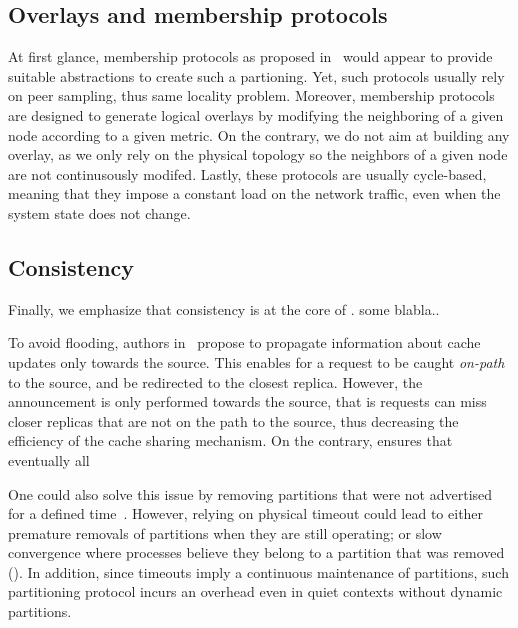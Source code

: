\subsection*{Overlays and membership protocols}
At first glance, membership protocols as proposed in~\cite{t-man} would appear to provide suitable abstractions to create such a partioning. Yet, such protocols usually rely on peer sampling, thus same locality problem.
Moreover, membership protocols are designed to generate logical overlays by modifying the neighboring of a given node according to a given metric. 
On the contrary, we do not aim at building any overlay, as we only rely on the physical topology so the neighbors of a given node are not continusously modifed. 
Lastly, these protocols are usually cycle-based, meaning that they impose a constant load on the network traffic, even when the system state does not change.

\subsection*{Consistency}
Finally, we emphasize that consistency is at the core of \NAME. some blabla..

To avoid flooding, authors in~\cite{opnl} propose to propagate information about cache updates only towards the source. This enables for a request to be caught \textit{on-path} to the source, and be redirected to the closest replica. However, the announcement is only performed towards the source, that is requests can miss closer replicas that are not on the path to the source, thus decreasing the efficiency of the cache sharing mechanism. On the contrary, \NAME ensures that eventually all 

One could also solve this issue by removing partitions that were not advertised for a defined time~\cite{hemmati2015namebased, garcia-lopez}.  
However, relying on physical timeout could lead to either premature removals of partitions when they are still operating; or slow convergence where processes believe they belong to a partition that was removed (). In addition, since timeouts imply a
continuous maintenance of partitions, such partitioning protocol
incurs an overhead even in quiet contexts without dynamic partitions.


% 
% 
% 

